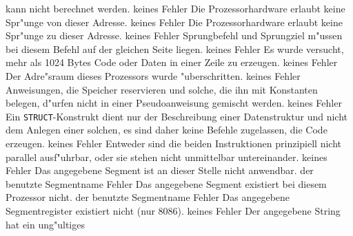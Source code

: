 \documentclass[12pt,a4paper,twoside]{report}
\newcommand{\tty}[1]{{\tt #1}}
\begin{document}
\begin{description}
{                kann nicht berechnet werden.}
               {keines}
               {Fehler}
               {Die Prozessorhardware erlaubt keine
                Spr"unge von dieser Adresse.}
               {keines}
               {Fehler}
               {Die Prozessorhardware erlaubt keine
                Spr"unge zu dieser Adresse.}
               {keines}
               {Fehler}
               {Sprungbefehl und Sprungziel m"ussen bei diesem
                Befehl auf der gleichen Seite liegen.}
               {keines}
               {Fehler}
               {Es wurde versucht, mehr als 1024 Bytes Code oder
                Daten in einer Zeile zu erzeugen.}
               {keines}
               {Fehler}
               {Der Adre"sraum dieses Prozessors wurde
                "uberschritten.}
               {keines}
               {Fehler}
               {Anweisungen, die Speicher reservieren und solche,
                die ihn mit Konstanten belegen, d"urfen nicht in einer
                Pseudoanweisung gemischt werden.}
               {keines}
               {Fehler}
               {Ein \tty{STRUCT}-Konstrukt dient nur der Beschreibung
                einer Datenstruktur und nicht dem Anlegen einer solchen,
                es sind daher keine Befehle zugelassen, die Code erzeugen.}
               {keines}
               {Fehler}
               {Entweder sind die beiden Instruktionen
                prinzipiell nicht parallel ausf"uhrbar, oder sie stehen nicht
                unmittelbar untereinander.}
               {keines}
               {Fehler}
               {Das angegebene Segment ist an dieser Stelle
                nicht anwendbar.}
               {der benutzte Segmentname}
               {Fehler}
               {Das angegebene Segment existiert bei
                diesem Prozessor nicht.}
               {der benutzte Segmentname}
               {Fehler}
               {Das angegebene Segmentregister existiert
                nicht (nur 8086).}
               {keines}
               {Fehler}
               {Der angegebene String hat ein ung"ultiges
}
\end{description}
\end{document}
